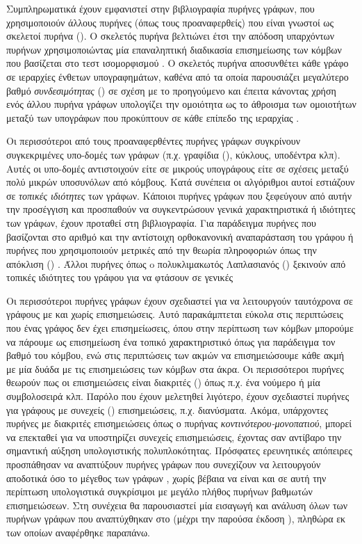Συμπληρωματικά έχουν εμφανιστεί στην βιβλιογραφία πυρήνες γράφων, που χρησιμοποιούν άλλους πυρήνες (όπως τους προαναφερθείς) που είναι γνωστοί ως σκελετοί πυρήνα ().
Ο σκελετός πυρήνα  βελτιώνει έτσι την απόδοση υπαρχόντων πυρήνων χρησιμοποιώντας μία επαναληπτική διαδικασία επισημείωσης των κόμβων που βασίζεται στο τεστ ισομορφισμού  \cite{shervashidze2011weisfeiler}.
Ο σκελετός πυρήνα  αποσυνθέτει κάθε γράφο σε ιεραρχίες ένθετων υπογραφημάτων, καθένα από τα οποία παρουσιάζει μεγαλύτερο βαθμό \textit{συνδεσιμότητας} () σε σχέση με το προηγούμενο και έπειτα κάνοντας χρήση ενός άλλου πυρήνα γράφων υπολογίζει την ομοιότητα ως το άθροισμα των ομοιοτήτων μεταξύ των υπογράφων που προκύπτουν σε κάθε επίπεδο της ιεραρχίας \cite{nikolentzos2018}.\par
Οι περισσότεροι από τους προαναφερθέντες πυρήνες γράφων συγκρίνουν συγκεκριμένες υπο-δομές των γράφων (π.χ. γραφίδια (), κύκλους, υποδέντρα κλπ).
Αυτές οι υπο-δομές αντιστοιχούν είτε σε μικρούς υπογράφους είτε σε σχέσεις μεταξύ πολύ μικρών υποσυνόλων από κόμβους.
Κατά συνέπεια οι αλγόριθμοι αυτοί εστιάζουν σε \textit{τοπικές ιδιότητες} των γράφων.
Κάποιοι πυρήνες γράφων που ξεφεύγουν από αυτήν την προσέγγιση και προσπαθούν να συγκεντρώσουν γενικά χαρακτηριστικά ή ιδιότητες των γράφων, έχουν προταθεί στη βιβλιογραφία.
Για παράδειγμα πυρήνες που βασίζονται στο αριθμό  και την αντίστοιχη ορθοκανονική αναπαράσταση του γράφου \cite{johansson2014global} ή πυρήνες που χρησιμοποιούν μετρικές από την θεωρία πληροφοριών όπως την απόκλιση ()  \cite{Bai12}.
Άλλοι πυρήνες όπως o πολυκλιμακωτός Λαπλασιανός () ξεκινούν από τοπικές ιδιότητες του γράφου για να φτάσουν σε γενικές \cite{kondor2016multiscale}\par
Οι περισσότεροι πυρήνες γράφων έχουν σχεδιαστεί για να λειτουργούν ταυτόχρονα σε γράφους με και χωρίς επισημειώσεις.
Αυτό παρακάμπτεται εύκολα στις περιπτώσεις που ένας γράφος δεν έχει επισημείωσεις, όπου στην περίπτωση των κόμβων μπορούμε να πάρουμε ως επισημείωση ένα τοπικό χαρακτηριστικό όπως για παράδειγμα τον βαθμό του κόμβου, ενώ στις περιπτώσεις των ακμών να επισημειώσουμε κάθε ακμή με μία δυάδα με τις επισημειώσεις των κόμβων στα άκρα.
Οι περισσότεροι πυρήνες θεωρούν πως οι επισημειώσεις είναι διακριτές () όπως π.χ. ένα νούμερο ή μία συμβολοσειρά κλπ.
Παρόλο που έχουν μελετηθεί λιγότερο, έχουν σχεδιαστεί πυρήνες για γράφους με συνεχείς () επισημειώσεις, π.χ. διανύσματα.
Ακόμα, υπάρχοντες πυρήνες με διακριτές επισημειώσεις όπως ο πυρήνας \textit{κοντινότερου-μονοπατιού}, μπορεί να επεκταθεί για να υποστηρίζει συνεχείς επισημειώσεις, έχοντας σαν αντίβαρο την σημαντική αύξηση υπολογιστικής πολυπλοκότητας. 
Πρόσφατες ερευνητικές απόπειρες προσπάθησαν να αναπτύξουν πυρήνες γράφων που συνεχίζουν να λειτουργούν αποδοτικά όσο το μέγεθος των γράφων \cite{Feragen13, Orsini2015, Morris16}, χωρίς βέβαια να είναι και σε αυτή την περίπτωση υπολογιστικά συγκρίσιμοι με μεγάλο πλήθος πυρήνων βαθμωτών επισημειώσεων.
Στη συνέχεια θα παρουσιαστεί μία εισαγωγή και ανάλυση όλων των πυρήνων γράφων που αναπτύχθηκαν στο  (μέχρι την παρούσα έκδοση ), πληθώρα εκ των οποίων αναφέρθηκε παραπάνω.
